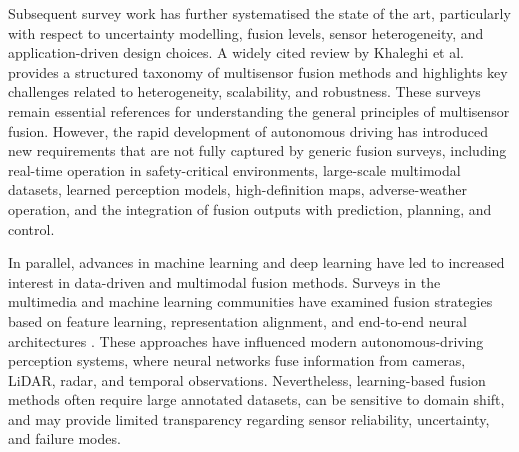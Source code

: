 \documentclass[11pt,oneside,openany]{book}
\begin{document}
Subsequent survey work has further systematised the state of the art, particularly with respect to uncertainty modelling, fusion levels, sensor heterogeneity, and application-driven design choices. A widely cited review by Khaleghi et al. \cite{khaleghi_multisensor_2013} provides a structured taxonomy of multisensor fusion methods and highlights key challenges related to heterogeneity, scalability, and robustness. These surveys remain essential references for understanding the general principles of multisensor fusion. However, the rapid development of autonomous driving has introduced new requirements that are not fully captured by generic fusion surveys, including real-time operation in safety-critical environments, large-scale multimodal datasets, learned perception models, high-definition maps, adverse-weather operation, and the integration of fusion outputs with prediction, planning, and control.

In parallel, advances in machine learning and deep learning have led to increased interest in data-driven and multimodal fusion methods. Surveys in the multimedia and machine learning communities have examined fusion strategies based on feature learning, representation alignment, and end-to-end neural architectures \cite{atrey_multimodal_2010, baltrusaitis_multimodal_2019}. These approaches have influenced modern autonomous-driving perception systems, where neural networks fuse information from cameras, LiDAR, radar, and temporal observations. Nevertheless, learning-based fusion methods often require large annotated datasets, can be sensitive to domain shift, and may provide limited transparency regarding sensor reliability, uncertainty, and failure modes.
\end{document}
